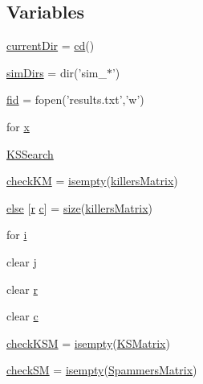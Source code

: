\subsection*{Variables}
\begin{DoxyCompactItemize}
\item 
\hyperlink{a00031_af32eb97339f1e9d37b5540de2cbc79c9}{current\-Dir} = \hyperlink{a00110_a767271ad82d244871370a0f0e6a7f8a4}{cd}()
\item 
\hyperlink{a00031_aae5035eb84b89176ed5b06e136325eff}{sim\-Dirs} = dir('sim\-\_\-$\ast$')
\item 
\hyperlink{a00031_ae9011d40c6f13e68e6f07156e0da7c5d}{fid} = fopen('results.\-txt','w')
\item 
for \hyperlink{a00031_a7265972fe485274cfff77a9bb07b8fce}{x}
\item 
\hyperlink{a00031_af04f94b875b4f18fd2d6bd47d989f2b8}{K\-S\-Search}
\item 
\hyperlink{a00031_ac9c871eaf7455dc0d274ec20c5c69ac2}{check\-K\-M} = \hyperlink{a00025_ac10445404f4b83302522defb59e25ef7}{isempty}(\hyperlink{a00030_ab372fd9c8bb38cf3c78e995c0698b0ca}{killers\-Matrix})
\item 
\hyperlink{a00031_af5946383720aa572eb93e1e63afc23c2}{else} \mbox{[}\hyperlink{a00031_ac862e7284527eb913b1351c8bfb8e079}{r} \hyperlink{a00035_a6be92348ba85ef257b11d06209e1d7b6}{c}\mbox{]} = \hyperlink{a00104_ae113ea7f9e515a12ac4b5595c6faf61e}{size}(\hyperlink{a00030_ab372fd9c8bb38cf3c78e995c0698b0ca}{killers\-Matrix})
\item 
for \hyperlink{a00031_a66a219c6834c25b0073a6bb84e1e0117}{i}
\item 
clear \hyperlink{a00031_ad34e9c7e9ae69ae0b9f1866faed5e4ad}{j}
\item 
clear \hyperlink{a00031_ac862e7284527eb913b1351c8bfb8e079}{r}
\item 
clear \hyperlink{a00031_a8e54ca14679a1ce9245a3b7d55d95570}{c}
\item 
\hyperlink{a00031_a67eb148eecfd241148ce3711f058ac2b}{check\-K\-S\-M} = \hyperlink{a00025_ac10445404f4b83302522defb59e25ef7}{isempty}(\hyperlink{a00030_ab18f9eabd5f873bd17d226d786bc22df}{K\-S\-Matrix})
\item 
\hyperlink{a00031_ae80cf4c5bf659247b45bbad5d22dec52}{check\-S\-M} = \hyperlink{a00025_ac10445404f4b83302522defb59e25ef7}{isempty}(\hyperlink{a00030_a5bca8ffaecd726e70d088f2e00c9b4e0}{Spammers\-Matrix})
\end{DoxyCompactItemize}


